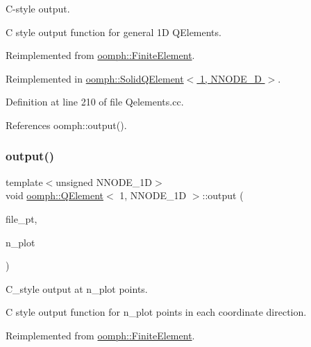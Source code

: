 C-\/style output. 

C style output function for general 1D Q\+Elements. 

Reimplemented from \hyperlink{classoomph_1_1FiniteElement_a72cddd09f8ddbee1a20a1ff404c6943e}{oomph\+::\+Finite\+Element}.



Reimplemented in \hyperlink{classoomph_1_1SolidQElement_3_011_00_01NNODE__1D_01_4_a48a580c256586164ec6ba559e100eb0f}{oomph\+::\+Solid\+Q\+Element$<$ 1, N\+N\+O\+D\+E\+\_\+D $>$}.



Definition at line 210 of file Qelements.\+cc.



References oomph\+::output().

\mbox{\label{classoomph_1_1QElement_3_011_00_01NNODE__1D_01_4_a5ba26a038a5a26e6873753fb78cd6a5c}} 
\subsubsection{\texorpdfstring{output()}{output()}\hspace{0.1cm}{\footnotesize\ttfamily [4/4]}}
{\footnotesize\ttfamily template$<$unsigned N\+N\+O\+D\+E\+\_\+1D$>$ \\
void \hyperlink{classoomph_1_1QElement}{oomph\+::\+Q\+Element}$<$ 1, N\+N\+O\+D\+E\+\_\+1D $>$\+::output (\begin{DoxyParamCaption}\item[{F\+I\+LE $\ast$}]{file\+\_\+pt,  }\item[{const unsigned \&}]{n\+\_\+plot }\end{DoxyParamCaption})\hspace{0.3cm}{\ttfamily [virtual]}}



C\+\_\+style output at n\+\_\+plot points. 

C style output function for n\+\_\+plot points in each coordinate direction. 

Reimplemented from \hyperlink{classoomph_1_1FiniteElement_adfaee690bb0608f03320eeb9d110d48c}{oomph\+::\+Finite\+Element}.



